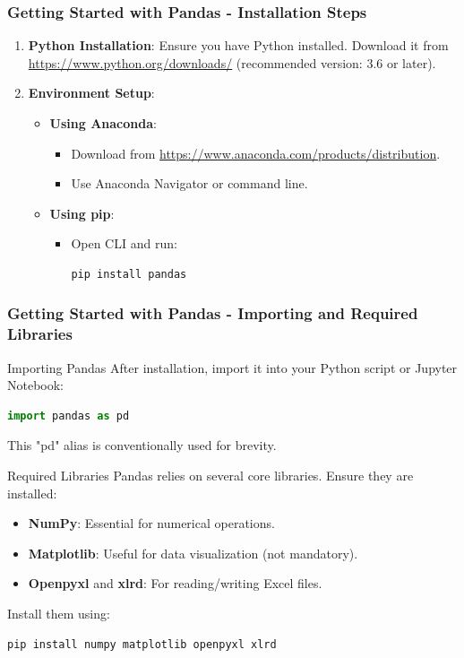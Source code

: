 \documentclass{beamer}
\begin{document}
\begin{frame}[fragile]
    \frametitle{Getting Started with Pandas - Installation Steps}
    \begin{enumerate}
        \item \textbf{Python Installation}: Ensure you have Python installed. 
        Download it from \url{https://www.python.org/downloads/} (recommended version: 3.6 or later).
        
        \item \textbf{Environment Setup}: 
        \begin{itemize}
            \item \textbf{Using Anaconda}:
            \begin{itemize}
                \item Download from \url{https://www.anaconda.com/products/distribution}.
                \item Use Anaconda Navigator or command line.
            \end{itemize}
            \item \textbf{Using pip}:
            \begin{itemize}
                \item Open CLI and run:
                \begin{lstlisting}[language=bash]
pip install pandas
                \end{lstlisting}
            \end{itemize}
        \end{itemize}
    \end{enumerate}
\end{frame}

\begin{frame}[fragile]
    \frametitle{Getting Started with Pandas - Importing and Required Libraries}
    \begin{block}{Importing Pandas}
        After installation, import it into your Python script or Jupyter Notebook:
        \begin{lstlisting}[language=python]
import pandas as pd
        \end{lstlisting}
        This "pd" alias is conventionally used for brevity.
    \end{block}

    \begin{block}{Required Libraries}
        Pandas relies on several core libraries. Ensure they are installed:
        \begin{itemize}
            \item \textbf{NumPy}: Essential for numerical operations.
            \item \textbf{Matplotlib}: Useful for data visualization (not mandatory).
            \item \textbf{Openpyxl} and \textbf{xlrd}: For reading/writing Excel files.
        \end{itemize}
        Install them using:
        \begin{lstlisting}[language=bash]
pip install numpy matplotlib openpyxl xlrd
        \end{lstlisting}
    \end{block}
\end{frame}
\end{document}
